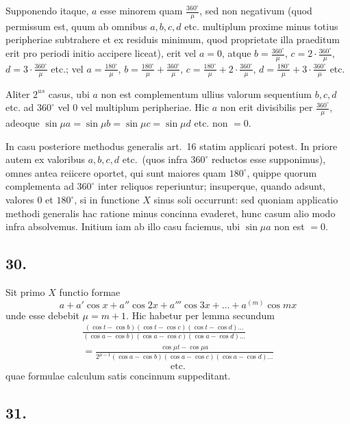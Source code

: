 \documentclass[12pt,a4paper]{article}
\theoremstyle{plain}
\begin{document}
Supponendo itaque, $a$ esse minorem quam $\frac{360^{\circ}}{\mu}$, sed non negativum (quod permissum est, quum ab omnibus $a, b, c, d$ etc. multiplum proxime minus totius
peripheriae subtrahere et ex residuis minimum, quod proprietate illa praeditum erit pro periodi initio accipere liceat), erit vel $a = 0$, atque $b = \frac{360^{\circ}}{\mu}$,
$c = 2\cdot\frac{360^{\circ}}{\mu}$, $d = 3\cdot\frac{360^{\circ}}{\mu}$ etc.; vel $a = \frac{180^{\circ}}{\mu}$,
$b = \frac{180^{\circ}}{\mu} + \frac{360^{\circ}}{\mu}$, $c = \frac{180^{\circ}}{\mu} + 2\cdot\frac{360^{\circ}}{\mu}$,
$d = \frac{180^{\circ}}{\mu} + 3\cdot\frac{360^{\circ}}{\mu}$ etc.

Aliter $2^{us}$ casus, ubi $a$ non est complementum ullius valorum sequentium
$b, c, d$ etc. ad $360^{\circ}$ vel $0$ vel multiplum peripheriae. Hic $a$ non erit divisibilis per $\frac{360^{\circ}}{\mu}$, adeoque $\sin\mu a = \sin\mu b = \sin\mu c = \sin\mu d$ etc. non $= 0$.

In casu posteriore methodus generalis art.\ 16 statim applicari potest. In priore autem ex valoribus $a, b, c, d$ etc.\ (quos infra $360^{\circ}$ reductos esse supponimus),
omnes antea reiicere oportet, qui sunt maiores quam $180^{\circ}$, quippe quorum complementa ad $360^{\circ}$ inter reliquos reperiuntur; insuperque, quando adsunt,
valores $0$ et $180^{\circ}$, si in functione $X$ sinus soli occurrunt: sed quoniam applicatio methodi generalis hac ratione minus concinna evaderet, hunc casum alio modo
infra absolvemus. Initium iam ab illo casu faciemus, ubi $\sin\mu a$ non est $= 0$.

\subsection*{30.}

Sit primo $X$ functio formae
\[
a + a'\cos x + a''\cos 2x + a'''\cos 3x + \ldots + a^{(m)}\cos mx
\]
unde esse debebit $\mu = m + 1$. Hic habetur per lemma secundum
\begin{multline*}
\frac{(\cos t - \cos b)(\cos t - \cos c)(\cos t - \cos d)\ldots}{(
\cos a - \cos b)(\cos a - \cos c)(\cos a - \cos d)\ldots}\\
= \frac{\cos\mu t - \cos\mu a}{2^{\mu-1}(\cos a - \cos b)(\cos a - \cos c)(\cos a - \cos d)\ldots}
\end{multline*}
\[\text{etc.}\]
quae formulae calculum satis concinnum suppeditant.

\subsection*{31.}
\end{document}
